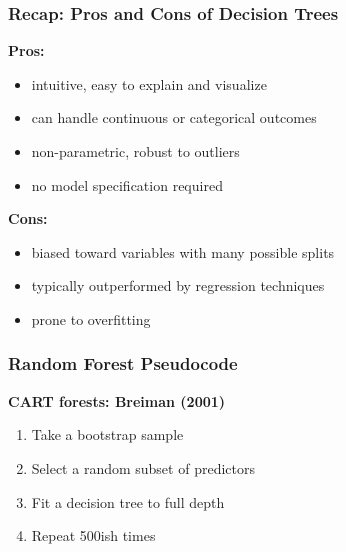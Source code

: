 \documentclass{beamer}\usepackage[]{graphicx}\usepackage[]{color}
\begin{document}

\begin{frame}
\frametitle{Recap: Pros and Cons of Decision Trees}

\textbf{Pros:}
\begin{itemize}
\item intuitive, easy to explain and visualize
\item can handle continuous or categorical outcomes
\item non-parametric, robust to outliers
\item no model specification required
\end{itemize}

\vspace{3ex}

\pause

\textbf{Cons:}
\begin{itemize}
\item biased toward variables with many possible splits
\item typically outperformed by regression techniques
\item prone to overfitting
\end{itemize}

\end{frame}


\begin{frame}
\frametitle{Random Forest Pseudocode}

\textbf{CART forests: Breiman (2001)}

\begin{enumerate}
\item Take a bootstrap sample
\pause
\item Select a random subset of predictors
\pause
\item Fit a decision tree to full depth
\pause
\item Repeat 500ish times
\end{enumerate}

\end{frame}

\end{document}
